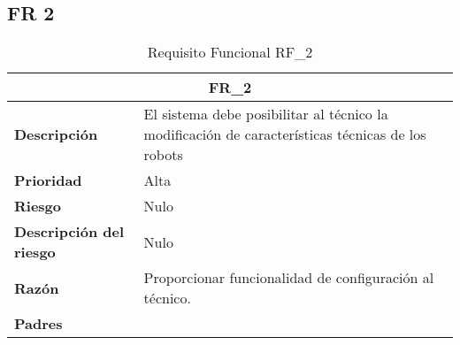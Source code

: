 \documentclass{scrreprt}
\begin{document}
\subsection{FR 2}
\begin{table}[H]
    
    \label{tab:my-table}
    
    \begin{tabular}{|p{5cm}|p{11cm}|}
    \hline
    \multicolumn{2}{|c|}{\textbf{FR_2}} \\
    \hline
    \textbf{Descripción  }                      & El sistema debe posibilitar al técnico la modificación de características técnicas de los robots                                                                                            \\ \hline
    \textbf{Prioridad}                          & Alta                                                                                              \\ \hline
    \textbf{Riesgo}                          & Nulo                                                                                                \\ \hline
    \textbf{Descripción del riesgo}                    & Nulo                                                                               \\ \hline
    \textbf{Razón}                   & Proporcionar funcionalidad de configuración al técnico.                                                                                                \\ \hline
    \textbf{Padres}                               &  \\  \hline
    \end{tabular}%
    
    \caption{Requisito Funcional RF_2}
\end{table}
\end{document}
